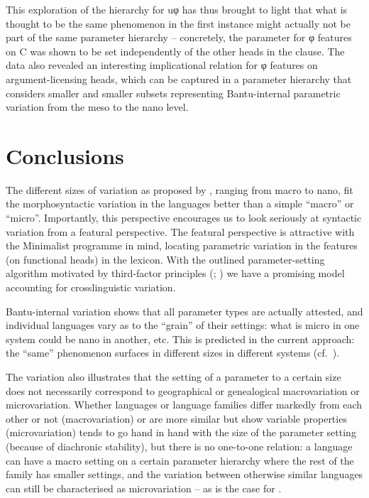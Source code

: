 \documentclass[output=paper]{langsci/langscibook}
\begin{document}
This exploration of the hierarchy for uφ  has thus brought to
light that what is thought to be the same phenomenon in the first instance
might actually not be part of the same parameter hierarchy -- concretely, the parameter for φ features on C was shown to be
set independently of the other heads in the clause. The data also revealed an
interesting implicational relation for φ features on argument-licensing heads,
which can be captured in a parameter hierarchy that
considers smaller and smaller subsets representing Bantu-internal
parametric variation from the meso to the nano level.

\section{Conclusions}\label{sec:3.4}

The different sizes of variation as proposed by \citet{BibRob2015}, ranging
from macro to nano, fit the morphosyntactic variation in the  languages
better than a simple \enquote{macro} or \enquote{micro}. Importantly, this perspective
encourages us to look seriously at syntactic variation from a featural
perspective. The featural perspective is attractive with the Minimalist
programme in mind, locating parametric variation in the features (on functional
heads) in the lexicon. With the outlined parameter-setting algorithm motivated
by third-factor principles (\citealt{Biberauer2017,Biberauer2017c};
\citealt{BibRob2017}) we have a promising model accounting for
crosslinguistic variation.

Bantu-internal variation shows that all parameter types are actually attested,
and individual languages vary as to the “grain” of their settings: what is
micro in one system could be nano in another, etc. This is predicted in the
current approach: the “same” phenomenon surfaces in different sizes in
different systems (cf.\ \citealt{BibRob2016,Ledgeway2013}).

The  variation also illustrates that the setting of a parameter to a
certain size does not necessarily correspond to geographical or genealogical
macrovariation or microvariation. Whether languages or language families differ
markedly from each other or not (macrovariation) or are more similar but show
variable properties (microvariation) tends to go hand in hand with the size of
the parameter setting (because of diachronic stability), but there is no
one-to-one relation: a language can have a macro setting on a certain parameter
hierarchy where the rest of the family has smaller settings, and the variation
between otherwise similar languages can still be characterised as
microvariation – as is the case for .
\end{document}
